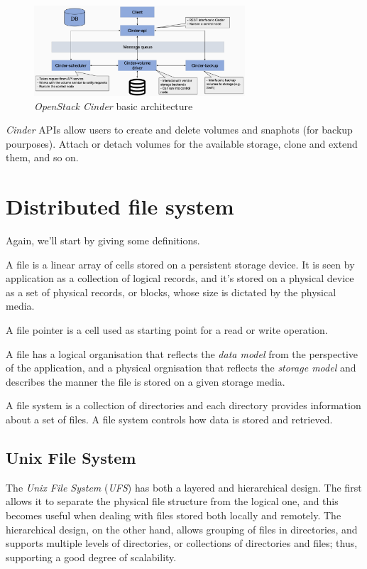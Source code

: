 \begin{figure}[h!]
    \centering
    \includegraphics[width=0.7\textwidth]{images/block-model-cinder.png}
    \caption{\emph{OpenStack Cinder} basic architecture}
\end{figure}

\noindent
\emph{Cinder} APIs allow users to create and delete volumes and snaphots (for
backup pourposes). Attach or detach volumes for the available storage, clone and
extend them, and so on.

\section{Distributed file system}
Again, we'll start by giving some definitions.

\begin{definition}[File]
    A file is a linear array of cells stored on a persistent storage device. It
    is seen by application as a collection of logical records, and it's stored
    on a physical device as a set of physical records, or blocks, whose size
    is dictated by the physical media.
\end{definition}
\begin{definition}
    A file pointer is a cell used as starting point for a read or write operation.
\end{definition}

\noindent
A file has a logical organisation that reflects the \emph{data model} from the
perspective of the application, and a physical orgnisation that reflects the
\emph{storage model} and describes the manner the file is stored on a given
storage media.

\begin{definition}
    A file system is a collection of directories and each directory provides
    information about a set of files. A file system controls how data is stored
    and retrieved.
\end{definition}

\subsection{Unix File System}
The \emph{Unix File System} (\emph{UFS}) has both a layered and hierarchical
design. The first allows it to separate the physical file structure from the
logical one, and this becomes useful when dealing with files stored both locally
and remotely. The hierarchical design, on the other hand, allows grouping of
files in directories, and supports multiple levels of directories, or collections
of directories and files; thus, supporting a good degree of scalability.


